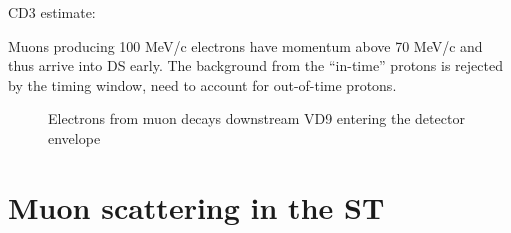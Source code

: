 \documentclass[12pt]{article}
\begin{document}
CD3 estimate: \cite{MU2E_4342_MUON_DECAYS_IN_FLIGHT_TDR}

Muons producing 100 MeV/c electrons have momentum above 70 MeV/c and thus arrive into DS early.
The background from the ``in-time'' protons is rejected by the timing window, need to account for
out-of-time protons.

\begin{figure}[H]
  \hspace{-0.6in}
  \caption{
    \label{fig:bmum0sb8b0_crt_vs_mom}
    Electrons from muon decays downstream VD9 entering the detector envelope
  }
\end{figure}


\section {Muon scattering in the ST}
\end{document}
